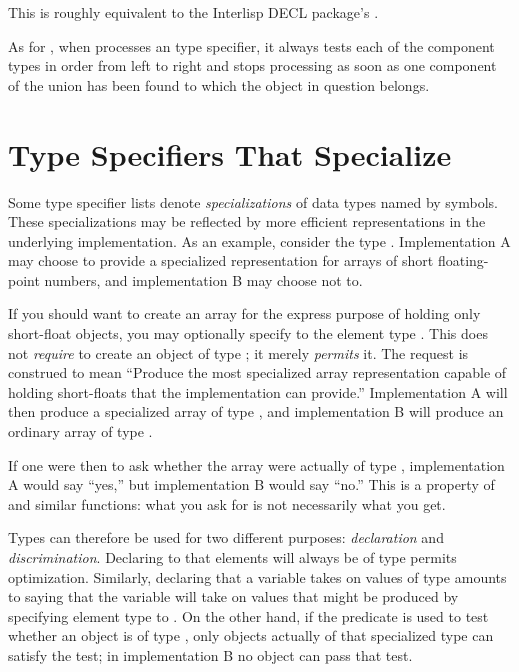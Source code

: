 \begin{flushdesc}
\beforenoterule
\begin{incompatibility}
This is roughly equivalent to
the Interlisp DECL package's .
\end{incompatibility}
\afternoterule

As for ,
when  processes an  type specifier, it always
tests each of the component types in order from left to right
and stops processing as soon as one component of the union has
been found to which the object in question belongs.
\end{flushdesc}

\section{Type Specifiers That Specialize}
\label{SPECIALIZED-TYPE-SPECIFIER-SECTION}

Some type specifier lists denote \emph{specializations} of
data types named by symbols.  These specializations may be
reflected by more efficient representations in the underlying
implementation.  As an example, consider the type .
Implementation A may choose to provide a specialized representation
for arrays of short floating-point numbers, and implementation B
may choose not to.

If you should want to create an array for the
express purpose of holding only short-float objects, you may
optionally specify to  the element type
.  This does not \emph{require}  to create
an object of type ; it merely \emph{permits} it.  The
request is construed to mean ``Produce the most specialized array
representation capable of holding short-floats that the implementation
can provide.''  Implementation A will then produce a specialized
array of type , and implementation B
will produce an ordinary array of type .

If one were then to ask whether the array were actually of type
, implementation A would say ``yes,'' but
implementation B would say ``no.''  This is a property of 
and similar functions: what you ask for is not necessarily what you get. 

\begin{obsolete}
Types can therefore be used for two different purposes:
\emph{declaration} and \emph{discrimination}.  Declaring to 
that elements will always be of type  permits
optimization.  Similarly, declaring that a variable takes on
values of type  amounts to saying that
the variable will take on values that might be produced by specifying
element type  to .
On the other hand, if the predicate  is used to test
whether an object is of type ,
only objects actually of that specialized type can satisfy the test;
in implementation B no object can pass that test.
\end{obsolete}

